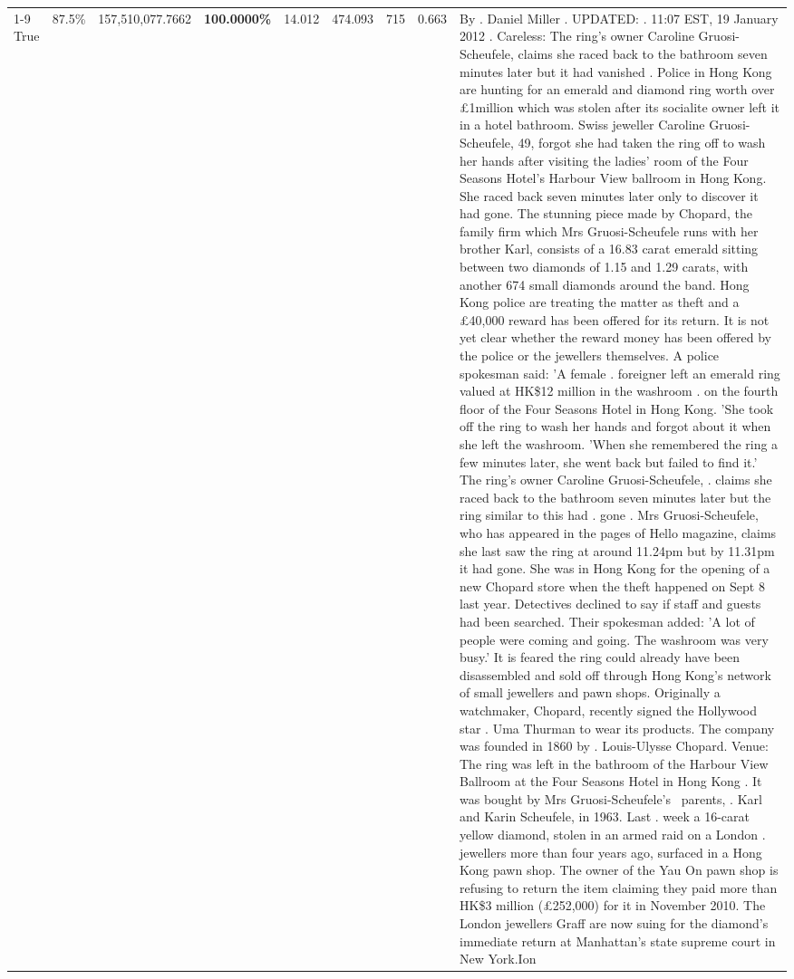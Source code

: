 \begin{table}[H]
\begin{tabular}{lllrlllll}
\cline{1-9}
True & 87.5\% & 157,510,077.7662 & \bfseries \color{red} 100.0000\% & 14.012 & 474.093 & 715 & 0.663 & By . Daniel Miller . UPDATED: . 11:07 EST, 19 January 2012 . Careless: The ring's owner Caroline Gruosi-Scheufele, claims she raced back to the bathroom seven minutes later but it had vanished . Police in Hong Kong are hunting for an emerald and diamond ring worth over £1million which was stolen after its socialite owner left it in a hotel bathroom. Swiss jeweller Caroline Gruosi-Scheufele, 49, forgot she had taken the ring off to wash her hands after visiting the ladies' room of the Four Seasons Hotel's Harbour View ballroom in Hong Kong. She raced back seven minutes later only to discover it had gone. The stunning piece made by Chopard, the family firm which Mrs Gruosi-Scheufele runs with her brother Karl, consists of a 16.83 carat emerald sitting between two diamonds of 1.15 and 1.29 carats, with another 674 small diamonds around the band. Hong Kong police are treating the matter as theft and a £40,000 reward has been offered for its return. It is not yet clear whether the reward money has been offered by the police or the jewellers themselves. A police spokesman said: 'A female . foreigner left an emerald ring valued at HK\$12 million in the washroom . on the fourth floor of the Four Seasons Hotel in Hong Kong. 'She took off the ring to wash her hands and forgot about it when she left the washroom. 'When she remembered the ring a few minutes later, she went back but failed to find it.' The ring's owner Caroline Gruosi-Scheufele, . claims she raced back to the bathroom seven minutes later but the ring similar to this had . gone . Mrs Gruosi-Scheufele, who has appeared in the pages of Hello magazine, claims she last saw the ring at around 11.24pm but by 11.31pm it had gone. She was in Hong Kong for the opening of a new Chopard store when the theft happened on Sept 8 last year. Detectives declined to say if staff and guests had been searched. Their spokesman added: 'A lot of people were coming and going. The washroom was very busy.' It is feared the ring could already have been disassembled and sold off through Hong Kong's network of small jewellers and pawn shops. Originally a watchmaker, Chopard, recently signed the Hollywood star . Uma Thurman to wear its products. The company was founded in 1860 by . Louis-Ulysse Chopard. Venue: The ring was left in the bathroom of the Harbour View Ballroom at the Four Seasons Hotel in Hong Kong . It was bought by Mrs Gruosi-Scheufele's  parents, . Karl and Karin Scheufele, in 1963. Last . week a 16-carat yellow diamond, stolen in an armed raid on a London . jewellers more than four years ago, surfaced in a Hong Kong pawn shop. The owner of the Yau On pawn shop is refusing to return the item claiming they paid more than HK\$3 million (£252,000) for it in November 2010. The London jewellers Graff are now suing for the diamond’s immediate return at Manhattan’s state supreme court in New York.Ion \\

\end{tabular}
\end{table}
